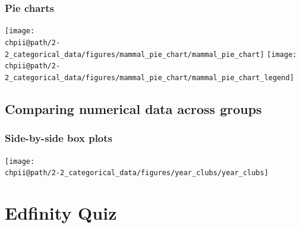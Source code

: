 \documentclass[slidestop,compress,mathserif]{beamer}
\makeatletter
\def\chpii@path{../../Chp 2}
\makeatother
\begin{document}
\begin{frame}
\frametitle{Pie charts}


\vspace{-0.5cm}

\begin{center}
\texttt{[image: \\chpii@path/2-2\_categorical\_data/figures/mammal\_pie\_chart/mammal\_pie\_chart]}
\texttt{[image: \\chpii@path/2-2\_categorical\_data/figures/mammal\_pie\_chart/mammal\_pie\_chart\_legend]}
\end{center}


\end{frame}



\subsection{Comparing numerical data across groups}


\begin{frame}
\frametitle{Side-by-side box plots}


\begin{center}
\texttt{[image: \\chpii@path/2-2\_categorical\_data/figures/year\_clubs/year\_clubs]}
\end{center}

\end{frame}


\section{Edfinity Quiz}


\end{document}
